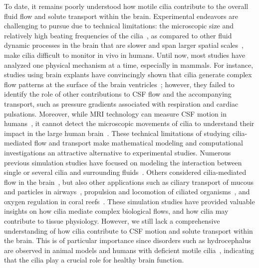 \documentclass{WileyMSP-template}
\begin{document}
To date, it remains poorly understood how motile cilia contribute to 
the overall fluid flow and solute transport within the brain.
Experimental endeavors are challenging to pursue due to
technical limitations: the microscopic size and relatively 
high beating frequencies of the cilia~\cite{ocallaghan2012analysis, mahuzier2018ependymal,
Jeong2022MeasurementTelencephalon, Olstad2019CiliaryDevelopment, spassky2013motile, DGama2021Diversity},
as compared to other fluid dynamic processes in the brain that are slower and span larger
spatial scales~\cite{Vinje2019RespiratoryMeasurements, eide2024functional, fultz2019coupled, mestre2018flow},
make cilia difficult to monitor in vivo in humans.
Until now, most studies have analyzed one physical mechanism at a time, especially in mammals.
For instance, studies using brain explants have convincingly shown
that cilia generate complex flow patterns at the surface of the brain
ventricles~\cite{Faubel2016Cilia-basedVentricles, Sawamoto2006NewBrain, ibanez2003beat};
however, they failed to identify the role of other contributions to CSF
flow and the accompanying transport, such as pressure
gradients associated with respiration and cardiac pulsations. Moreover, while MRI technology
can measure CSF motion in humans~\cite{feinberg1987human, battal2011cerebrospinal,
yamada2015current}, it cannot detect the microscopic
movements of cilia to understand their impact in the large human
brain~\cite{Siyahhan2014FlowVentricles}. 
These technical limitations of studying cilia-mediated flow and transport make 
mathematical modeling and computational investigations an attractive alternative to experimental
studies. Numerous previous simulation studies have focused on modeling the interaction
between single or several cilia and surrounding
fluids~\cite{Guo2020SimulatingGeometries, Ruvalcaba2021NumericalTree, Smith2009MathematicalFluids,
Cui2019NumericalMethod, Cui2022AFlow}.
Others considered cilia-mediated flow in the brain~\cite{Siyahhan2014FlowVentricles,
Yoshida2022EffectVentricles, Salman2022ComputationalEmbryo, Thouvenin2020OriginCanal}, but also 
other applications such as ciliary transport of mucous and particles in
airways~\cite{Fulford1986Muco-ciliaryLung, Ramirez-SanJuan2020Multi-scaleArrays, roth2025structure},
propulsion and locomotion of ciliated organisms~\cite{BLAKE1974MechanicsMotion,
Jahn1972LocomotionProtozoa, Brennen1977FluidFlagella}, and
oxygen regulation in coral reefs~\cite{Pacherres2022CiliaryProduction}.
These simulation studies have provided valuable insights on how cilia mediate complex
biological flows, and how cilia may contribute to tissue physiology.
However, we still lack a comprehensive understanding of how
cilia contribute to CSF motion and solute transport within the brain.
This is of particular importance since disorders such as hydrocephalus are observed
in animal models and humans with deficient motile cilia~\cite{Afzelius2004CiliaRelatedDiseases,
Olstad2019CiliaryDevelopment, Mitchison2017Motile, Ibanez-Tallon2002LossHydrocephalus},
indicating that the cilia play a crucial role for healthy brain function. 
\end{document}
